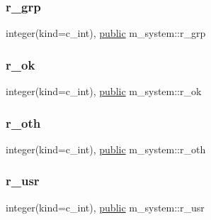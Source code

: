 \mbox{\label{namespacem__system_adb853ed1f9d39c45e0b512ab39c66605}} 
\subsubsection{\texorpdfstring{r\+\_\+grp}{r\_grp}}
{\footnotesize\ttfamily integer(kind=c\+\_\+int), \hyperlink{M__stopwatch_83_8txt_a2f74811300c361e53b430611a7d1769f}{public} m\+\_\+system\+::r\+\_\+grp}

\mbox{\label{namespacem__system_a801e3ccad38d0814e4f1e62e939e9649}} 
\subsubsection{\texorpdfstring{r\+\_\+ok}{r\_ok}}
{\footnotesize\ttfamily integer(kind=c\+\_\+int), \hyperlink{M__stopwatch_83_8txt_a2f74811300c361e53b430611a7d1769f}{public} m\+\_\+system\+::r\+\_\+ok}

\mbox{\label{namespacem__system_a74de84d2cb6b74e9d0d4c5aa5f1ba953}} 
\subsubsection{\texorpdfstring{r\+\_\+oth}{r\_oth}}
{\footnotesize\ttfamily integer(kind=c\+\_\+int), \hyperlink{M__stopwatch_83_8txt_a2f74811300c361e53b430611a7d1769f}{public} m\+\_\+system\+::r\+\_\+oth}

\mbox{\label{namespacem__system_ace7825dd19ed7191b37d3a7a27c75431}} 
\subsubsection{\texorpdfstring{r\+\_\+usr}{r\_usr}}
{\footnotesize\ttfamily integer(kind=c\+\_\+int), \hyperlink{M__stopwatch_83_8txt_a2f74811300c361e53b430611a7d1769f}{public} m\+\_\+system\+::r\+\_\+usr}

